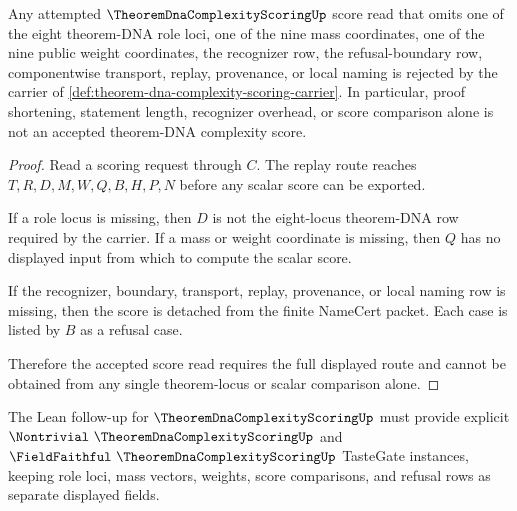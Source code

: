 \begin{theorem}
\label{thm:theorem-dna-complexity-scoring-refusal-boundary}
Any attempted $\TheoremDnaComplexityScoringUp$ score read that omits one of the eight theorem-DNA role loci, one of the nine mass coordinates, one of the nine public weight coordinates, the recognizer row, the refusal-boundary row, componentwise transport, replay, provenance, or local naming is rejected by the carrier of \autoref{def:theorem-dna-complexity-scoring-carrier}. In particular, proof shortening, statement length, recognizer overhead, or score comparison alone is not an accepted theorem-DNA complexity score.
\end{theorem}
\begin{proof}
Read a scoring request through $C$. The replay route reaches $T,R,D,M,W,Q,B,H,P,N$ before any scalar score can be exported.

If a role locus is missing, then $D$ is not the eight-locus theorem-DNA row required by the carrier. If a mass or weight coordinate is missing, then $Q$ has no displayed input from which to compute the scalar score.

If the recognizer, boundary, transport, replay, provenance, or local naming row is missing, then the score is detached from the finite NameCert packet. Each case is listed by $B$ as a refusal case.

Therefore the accepted score read requires the full displayed route and cannot be obtained from any single theorem-locus or scalar comparison alone.
\end{proof}



The Lean follow-up for $\TheoremDnaComplexityScoringUp$ must provide explicit $\Nontrivial\ \TheoremDnaComplexityScoringUp$ and $\FieldFaithful\ \TheoremDnaComplexityScoringUp$ TasteGate instances, keeping role loci, mass vectors, weights, score comparisons, and refusal rows as separate displayed fields.

